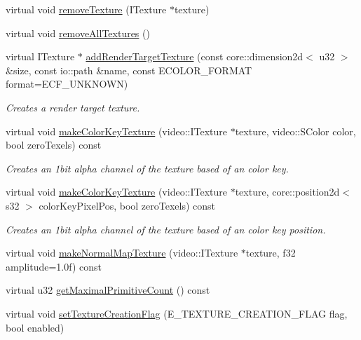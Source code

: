\begin{DoxyCompactItemize}
\item 
virtual void \hyperlink{classirr_1_1video_1_1_c_null_driver_a942ab5c4e49d732305ff5a6fa2941424}{remove\-Texture} (I\-Texture $\ast$texture)
\item 
virtual void \hyperlink{classirr_1_1video_1_1_c_null_driver_af5dba93308f1bcd4916ca60512139017}{remove\-All\-Textures} ()
\item 
\hypertarget{classirr_1_1video_1_1_c_null_driver_a6eecb10b675253a27afb3158528829cf}{virtual I\-Texture $\ast$ \hyperlink{classirr_1_1video_1_1_c_null_driver_a6eecb10b675253a27afb3158528829cf}{add\-Render\-Target\-Texture} (const core\-::dimension2d$<$ u32 $>$ \&size, const io\-::path \&name, const E\-C\-O\-L\-O\-R\-\_\-\-F\-O\-R\-M\-A\-T format=E\-C\-F\-\_\-\-U\-N\-K\-N\-O\-W\-N)}\label{classirr_1_1video_1_1_c_null_driver_a6eecb10b675253a27afb3158528829cf}

\begin{DoxyCompactList}\small\item\em Creates a render target texture. \end{DoxyCompactList}\item 
virtual void \hyperlink{classirr_1_1video_1_1_c_null_driver_afa41059c4a1f308ae77186338895616f}{make\-Color\-Key\-Texture} (video\-::\-I\-Texture $\ast$texture, video\-::\-S\-Color color, bool zero\-Texels) const 
\begin{DoxyCompactList}\small\item\em Creates an 1bit alpha channel of the texture based of an color key. \end{DoxyCompactList}\item 
virtual void \hyperlink{classirr_1_1video_1_1_c_null_driver_a0ed918157551ed55421e4cec4c234c82}{make\-Color\-Key\-Texture} (video\-::\-I\-Texture $\ast$texture, core\-::position2d$<$ s32 $>$ color\-Key\-Pixel\-Pos, bool zero\-Texels) const 
\begin{DoxyCompactList}\small\item\em Creates an 1bit alpha channel of the texture based of an color key position. \end{DoxyCompactList}\item 
virtual void \hyperlink{classirr_1_1video_1_1_c_null_driver_ac9b5f1f896109d190ca62144b5ebabdb}{make\-Normal\-Map\-Texture} (video\-::\-I\-Texture $\ast$texture, f32 amplitude=1.\-0f) const 
\item 
virtual u32 \hyperlink{classirr_1_1video_1_1_c_null_driver_a309d710b5cbec16c81c8a1d1d536866c}{get\-Maximal\-Primitive\-Count} () const 
\item 
\hypertarget{classirr_1_1video_1_1_c_null_driver_a84c2840b99170e011dc97ee83a23ca13}{virtual void \hyperlink{classirr_1_1video_1_1_c_null_driver_a84c2840b99170e011dc97ee83a23ca13}{set\-Texture\-Creation\-Flag} (E\-\_\-\-T\-E\-X\-T\-U\-R\-E\-\_\-\-C\-R\-E\-A\-T\-I\-O\-N\-\_\-\-F\-L\-A\-G flag, bool enabled)}\label{classirr_1_1video_1_1_c_null_driver_a84c2840b99170e011dc97ee83a23ca13}


\end{DoxyCompactItemize}
